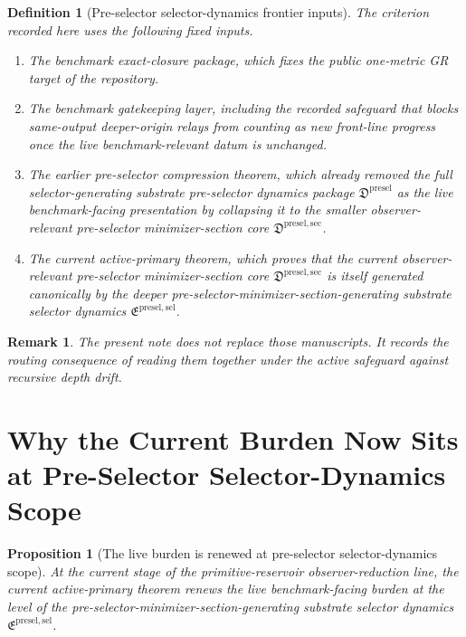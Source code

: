 \documentclass[11pt]{article}
\newcommand{\PreSelectorPackage}{\mathfrak D^{\mathrm{presel}}}
\newcommand{\PreSelectorMinSectionCore}{\mathfrak D^{\mathrm{presel,sec}}}
\newcommand{\PreSectionSelectorPackage}{\mathfrak E^{\mathrm{presel,sel}}}
\newtheorem{definition}{Definition}
\newtheorem{proposition}{Proposition}
\newtheorem{remark}{Remark}
\begin{document}
\begin{definition}[Pre-selector selector-dynamics frontier inputs]
The criterion recorded here uses the following fixed inputs.
\begin{enumerate}
    \item The benchmark exact-closure package, which fixes the public one-metric GR target of the repository.
    \item The benchmark gatekeeping layer, including the recorded safeguard that blocks same-output deeper-origin relays from counting as new front-line progress once the live benchmark-relevant datum is unchanged.
    \item The earlier pre-selector compression theorem, which already removed the full selector-generating substrate pre-selector dynamics package \(\PreSelectorPackage\) as the live benchmark-facing presentation by collapsing it to the smaller observer-relevant pre-selector minimizer-section core \(\PreSelectorMinSectionCore\).
    \item The current active-primary theorem, which proves that the current observer-relevant pre-selector minimizer-section core \(\PreSelectorMinSectionCore\) is itself generated canonically by the deeper pre-selector-minimizer-section-generating substrate selector dynamics \(\PreSectionSelectorPackage\).
\end{enumerate}
\end{definition}

\begin{remark}
The present note does not replace those manuscripts. It records the routing consequence of reading them together under the active safeguard against recursive depth drift.
\end{remark}

\section{Why the Current Burden Now Sits at Pre-Selector Selector-Dynamics Scope}

\begin{proposition}[The live burden is renewed at pre-selector selector-dynamics scope]
At the current stage of the primitive-reservoir observer-reduction line, the current active-primary theorem renews the live benchmark-facing burden at the level of the pre-selector-minimizer-section-generating substrate selector dynamics \(\PreSectionSelectorPackage\).
\end{proposition}
\end{document}
